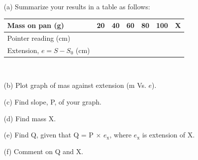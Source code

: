 \begin{enumerate}
\begin{itemize}
\item[(a)] Summarize your results in a table as follows:\\[10pt]
\begin{center}
\begin{tabular}{|l|c|c|c|c|c|c|} \hline
Mass on pan (g) &20&40&60&80&100&X \\ \hline
Pointer reading (cm) &&&&&& \\ \hline
Extension, $e = S - S_0$ (cm) &&&&&& \\ \hline
\end{tabular} \\[10pt]
\end{center}
\item[(b)] Plot graph of mas against extension (m Vs. $e$).
\item[(c)] Find slope, P, of your graph.
\item[(d)] Find mass X.
\item[(e)] Find Q, given that Q = P $\times$ $e_\text{x}$, where $e_\text{x}$ is extension of X.
\item[(f)] Comment on Q and X.
\end{itemize}


\end{enumerate}

